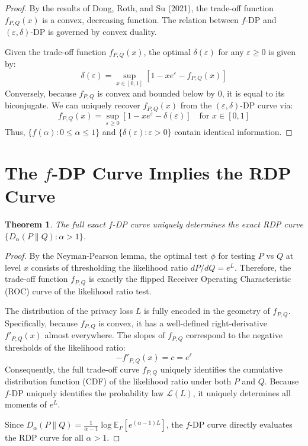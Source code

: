 \documentclass[11pt]{article}
\newtheorem{theorem}{Theorem}
\begin{document}
\begin{proof}
By the results of Dong, Roth, and Su (2021), the trade-off function $f_{P,Q}(x)$ is a convex, decreasing function. The relation between $f$-DP and $(\varepsilon, \delta)$-DP is governed by convex duality. 

Given the trade-off function $f_{P,Q}(x)$, the optimal $\delta(\varepsilon)$ for any $\varepsilon \ge 0$ is given by:
\[ \delta(\varepsilon) = \sup_{x \in [0,1]} \left[ 1 - x e^\varepsilon - f_{P,Q}(x) \right] \]
Conversely, because $f_{P,Q}$ is convex and bounded below by $0$, it is equal to its biconjugate. We can uniquely recover $f_{P,Q}(x)$ from the $(\varepsilon, \delta)$-DP curve via:
\[ f_{P,Q}(x) = \sup_{\varepsilon \ge 0} \left[ 1 - x e^\varepsilon - \delta(\varepsilon) \right] \quad \text{for } x \in [0,1] \]
Thus, $\{f(\alpha) : 0 \le \alpha \le 1\}$ and $\{\delta(\varepsilon) : \varepsilon > 0\}$ contain identical information.
\end{proof}

\section{The $f$-DP Curve Implies the RDP Curve}

\begin{theorem}
The full exact $f$-DP curve uniquely determines the exact RDP curve $\{D_\alpha(P\|Q) : \alpha > 1\}$.
\end{theorem}

\begin{proof}
By the Neyman-Pearson lemma, the optimal test $\phi$ for testing $P$ vs $Q$ at level $x$ consists of thresholding the likelihood ratio $dP/dQ = e^L$. Therefore, the trade-off function $f_{P,Q}$ is exactly the flipped Receiver Operating Characteristic (ROC) curve of the likelihood ratio test.

The distribution of the privacy loss $L$ is fully encoded in the geometry of $f_{P,Q}$. Specifically, because $f_{P,Q}$ is convex, it has a well-defined right-derivative $f'_{P,Q}(x)$ almost everywhere. The slopes of $f_{P,Q}$ correspond to the negative thresholds of the likelihood ratio:
\[ -f'_{P,Q}(x) = c = e^\ell \]
Consequently, the full trade-off curve $f_{P,Q}$ uniquely identifies the cumulative distribution function (CDF) of the likelihood ratio under both $P$ and $Q$. Because $f$-DP uniquely identifies the probability law $\mathcal{L}(L)$, it uniquely determines all moments of $e^L$. 

Since $D_\alpha(P\|Q) = \frac{1}{\alpha-1} \log \mathbb{E}_P [ e^{(\alpha-1)L} ]$, the $f$-DP curve directly evaluates the RDP curve for all $\alpha > 1$.
\end{proof}
\end{document}
